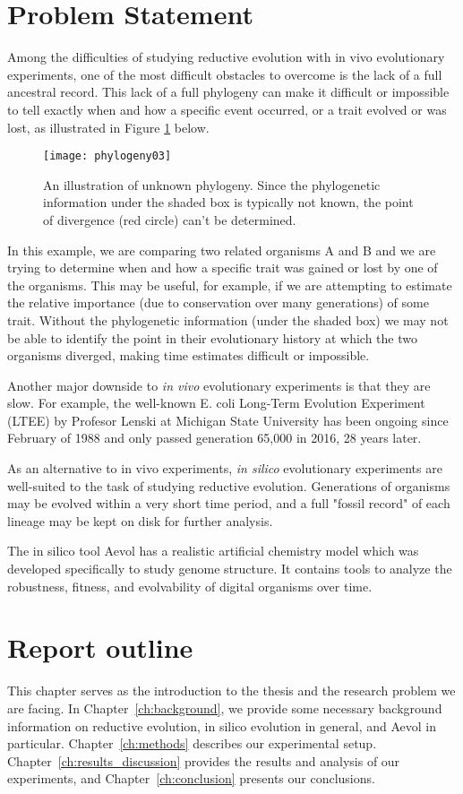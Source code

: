 \section{Problem Statement} \label{problem_statement}
Among the difficulties of studying reductive evolution with in vivo evolutionary experiments, one of the most difficult obstacles to overcome is the lack of a full ancestral record. This lack of a full phylogeny can make it difficult or impossible to tell exactly when and how a specific event occurred, or a trait evolved or was lost, as illustrated in Figure \ref{fig:phylogeny03} below. 
\begin{figure}[h]
\texttt{[image: phylogeny03]}
\centering
\caption[Unknown phylogeny]{An illustration of unknown phylogeny. Since the phylogenetic information under the shaded box is typically not known, the point of divergence (red circle) can't be determined.}
\label{fig:phylogeny03}
\end{figure}
In this example, we are comparing two related organisms A and B and we are trying to determine when and how a specific trait was gained or lost by one of the organisms. This may be useful, for example, if we are attempting to estimate the relative importance (due to conservation over many generations) of some trait. Without the phylogenetic information (under the shaded box) we may not be able to identify the point in their evolutionary history at which the two organisms diverged, making time estimates difficult or impossible.

Another major downside to \textit{in vivo} evolutionary experiments is that they are slow. For example, the well-known E. coli Long-Term Evolution Experiment (LTEE) by Profesor Lenski at Michigan State University has been ongoing since February of 1988 and only passed generation 65,000 in 2016, 28 years later. 

As an alternative to in vivo experiments, \textit{in silico} evolutionary experiments are well-suited to the task of studying reductive evolution. Generations of organisms may be evolved within a very short time period, and a full "fossil record" of each lineage may be kept on disk for further analysis. 

The in silico tool Aevol has a realistic artificial chemistry model which was developed specifically to study genome structure. It contains tools to analyze the robustness, fitness, and evolvability of digital organisms over time.  

\section{Report outline}
This chapter serves as the introduction to the thesis and the research problem we are facing. In Chapter~\ref{ch:background}, we provide some necessary background information on reductive evolution, in silico evolution in general, and Aevol in particular. Chapter~\ref{ch:methods} describes our experimental setup. Chapter~\ref{ch:results_discussion}
provides the results and analysis of our experiments, and Chapter~\ref{ch:conclusion} presents our conclusions. 


